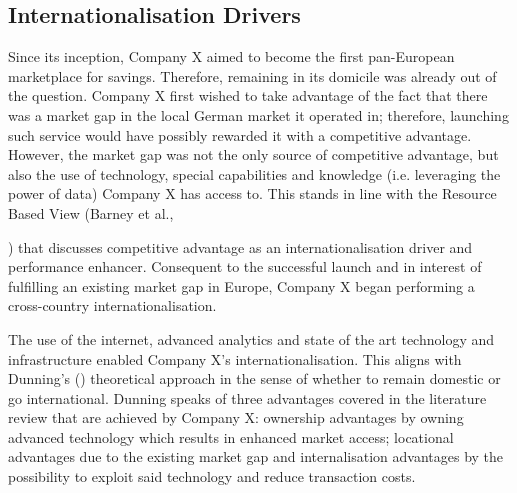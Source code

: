 \documentclass[11pt,a4paper]{article}
\begin{document}
{{\subsection{Internationalisation Drivers}
\vspace{-1mm}
\label{entry_motives}
 \par
Since its inception, Company X aimed to become the first pan-European marketplace for savings. Therefore, remaining in its domicile was already out of the question. Company X first wished to take advantage of the fact that there was a market gap in the local German market it operated in; therefore, launching such service would have possibly rewarded it with a competitive advantage. However, the market gap was not the only source of competitive advantage, but also the use of technology, special capabilities and knowledge (i.e. leveraging the power of data) Company X has access to. This stands in line with the Resource Based View (Barney et al., {\citeyear{barneyResourcebasedViewFirm2001}) that discusses competitive advantage as an internationalisation driver and performance enhancer. Consequent to the successful launch and in interest of fulfilling an existing market gap in Europe, Company X began performing a cross-country internationalisation. \par
The use of the internet, advanced analytics and state of the art technology and infrastructure enabled Company X's internationalisation. This aligns with Dunning's (\citeyear{dunningEclecticTheoryInternational1980}) theoretical approach in the sense of whether to remain domestic or go international. Dunning speaks of three advantages covered in the literature review that are achieved by Company X: ownership advantages by owning advanced technology which results in enhanced market access; locational advantages due to the existing market gap and internalisation advantages by the possibility to exploit said technology and reduce transaction costs.  \par

}}}
\end{document}
